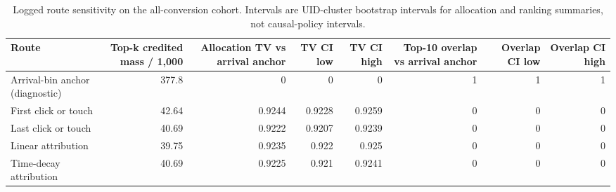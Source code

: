 \begin{table}
\caption{Logged route sensitivity on the all-conversion cohort. Intervals are UID-cluster bootstrap intervals for allocation and ranking summaries, not causal-policy intervals.}
\label{tab:exp2_route_sensitivity}
\begin{tabular}{lrrrrrrr}
\toprule
Route & Top-k credited mass / 1,000 & Allocation TV vs arrival anchor & TV CI low & TV CI high & Top-10 overlap vs arrival anchor & Overlap CI low & Overlap CI high \\
\midrule
Arrival-bin anchor (diagnostic) & 377.8 & 0 & 0 & 0 & 1 & 1 & 1 \\
First click or touch & 42.64 & 0.9244 & 0.9228 & 0.9259 & 0 & 0 & 0 \\
Last click or touch & 40.69 & 0.9222 & 0.9207 & 0.9239 & 0 & 0 & 0 \\
Linear attribution & 39.75 & 0.9235 & 0.922 & 0.925 & 0 & 0 & 0 \\
Time-decay attribution & 40.69 & 0.9225 & 0.921 & 0.9241 & 0 & 0 & 0 \\
\bottomrule
\end{tabular}
\end{table}
